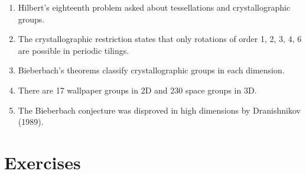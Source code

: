 \begin{enumerate}
    \item Hilbert's eighteenth problem asked about tessellations and crystallographic groups.
    \item The crystallographic restriction states that only rotations of order 1, 2, 3, 4, 6 are possible in periodic tilings.
    \item Bieberbach's theorems classify crystallographic groups in each dimension.
    \item There are 17 wallpaper groups in 2D and 230 space groups in 3D.
    \item The Bieberbach conjecture was disproved in high dimensions by Dranishnikov (1989).
\end{enumerate}

\section*{Exercises}

